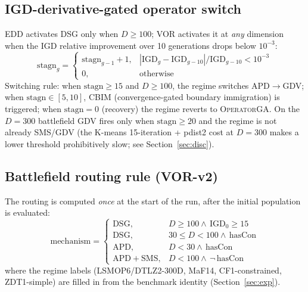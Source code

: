 \documentclass[preprint,12pt]{elsarticle}
\begin{document}
\subsection{IGD-derivative-gated operator switch}
\label{sec:igdgate}
\textsc{EDD} activates \textsc{DSG} only when $D\ge 100$; VOR activates it
at \emph{any} dimension when the IGD relative improvement over 10 generations
drops below $10^{-3}$:
\begin{equation}
\label{eq:stagn}
\mathrm{stagn}_g =
\begin{cases}
\mathrm{stagn}_{g-1}+1, &
\left|\mathrm{IGD}_g-\mathrm{IGD}_{g-10}\right|/\mathrm{IGD}_{g-10}<10^{-3}\\
0, & \text{otherwise}
\end{cases}
\end{equation}
Switching rule: when $\mathrm{stagn}\ge 15$ and $D\ge 100$, the regime
switches \textsc{APD}$\to$\textsc{GDV}; when $\mathrm{stagn}\in[5,10]$,
\textsc{CBIM} (convergence-gated boundary immigration) is triggered; when
$\mathrm{stagn}=0$ (recovery) the regime reverts to \textsc{OperatorGA}.
On the $D=300$ battlefield \textsc{GDV} fires only when
$\mathrm{stagn}\ge 20$ and the regime is not already \textsc{SMS}/\textsc{GDV}
(the K-means 15-iteration + pdist2 cost at $D=300$ makes a lower threshold
prohibitively slow; see Section~\ref{sec:disc}).

\subsection{Battlefield routing rule (VOR-v2)}
\label{sec:routing}
The routing is computed \emph{once} at the start of the run, after the
initial population is evaluated:
\begin{equation}
\label{eq:routing}
\mathrm{mechanism}=
\begin{cases}
\mathrm{DSG}, & D\ge 100\wedge\,\mathrm{IGD}_0\ge 15\\
\mathrm{DSG}, & 30\le D<100\wedge\,\mathrm{hasCon}\\
\mathrm{APD}, & D<30\wedge\,\mathrm{hasCon}\\
\mathrm{APD}+\mathrm{SMS}, & D<100\wedge\,\neg\,\mathrm{hasCon}
\end{cases}
\end{equation}
where the regime labels (LSMOP6/DTLZ2-300D, MaF14,
CF1-constrained, ZDT1-simple) are filled in from the benchmark
identity (Section~\ref{sec:exp}).
\end{document}
